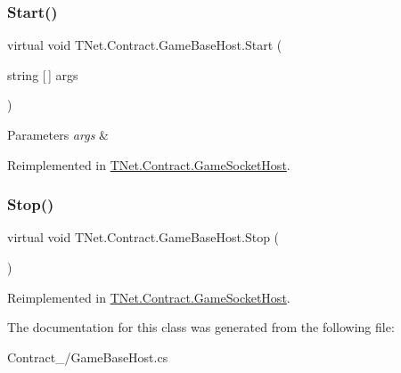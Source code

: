 \mbox{\label{class_t_net_1_1_contract_1_1_game_base_host_a0bd4b389a68a6922ee0b76b4cfe9a388}} 
\subsubsection{\texorpdfstring{Start()}{Start()}}
{\footnotesize\ttfamily virtual void T\+Net.\+Contract.\+Game\+Base\+Host.\+Start (\begin{DoxyParamCaption}\item[{string \mbox{[}$\,$\mbox{]}}]{args }\end{DoxyParamCaption})\hspace{0.3cm}{\ttfamily [virtual]}}






\begin{DoxyParams}{Parameters}
{\em args} & \\
\hline
\end{DoxyParams}


Reimplemented in \mbox{\hyperlink{class_t_net_1_1_contract_1_1_game_socket_host_a5ed0b1074c4e59abb3ff7e60eee2ceec}{T\+Net.\+Contract.\+Game\+Socket\+Host}}.

\mbox{\label{class_t_net_1_1_contract_1_1_game_base_host_aa20602c8a29aa52506336a861de32692}} 
\subsubsection{\texorpdfstring{Stop()}{Stop()}}
{\footnotesize\ttfamily virtual void T\+Net.\+Contract.\+Game\+Base\+Host.\+Stop (\begin{DoxyParamCaption}{ }\end{DoxyParamCaption})\hspace{0.3cm}{\ttfamily [virtual]}}







Reimplemented in \mbox{\hyperlink{class_t_net_1_1_contract_1_1_game_socket_host_a598542dacf31acc5a7a7602ff14a0b73}{T\+Net.\+Contract.\+Game\+Socket\+Host}}.



The documentation for this class was generated from the following file\+:\begin{DoxyCompactItemize}
\item 
Contract\+\_\+/Game\+Base\+Host.\+cs\end{DoxyCompactItemize}
